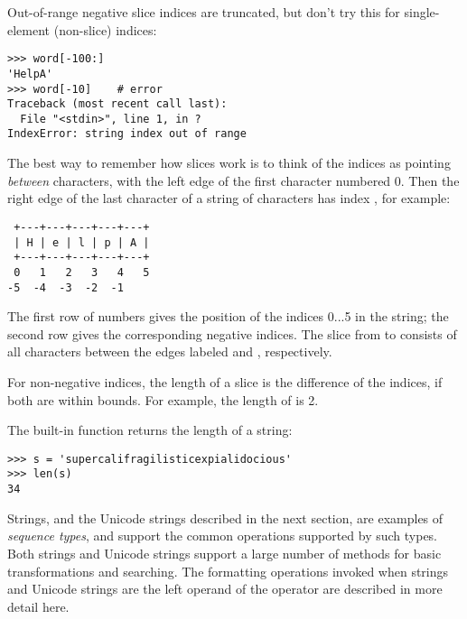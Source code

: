 \documentclass{manual}
\begin{document}
Out-of-range negative slice indices are truncated, but don't try this
for single-element (non-slice) indices:

\begin{verbatim}
>>> word[-100:]
'HelpA'
>>> word[-10]    # error
Traceback (most recent call last):
  File "<stdin>", line 1, in ?
IndexError: string index out of range
\end{verbatim}

The best way to remember how slices work is to think of the indices as
pointing \emph{between} characters, with the left edge of the first
character numbered 0.  Then the right edge of the last character of a
string of  characters has index , for example:

\begin{verbatim}
 +---+---+---+---+---+ 
 | H | e | l | p | A |
 +---+---+---+---+---+ 
 0   1   2   3   4   5 
-5  -4  -3  -2  -1
\end{verbatim}

The first row of numbers gives the position of the indices 0...5 in
the string; the second row gives the corresponding negative indices.
The slice from  to  consists of all characters between
the edges labeled  and , respectively.

For non-negative indices, the length of a slice is the difference of
the indices, if both are within bounds.  For example, the length of
 is 2.

The built-in function  returns the length of a string:

\begin{verbatim}
>>> s = 'supercalifragilisticexpialidocious'
>>> len(s)
34
\end{verbatim}


\begin{seealso}
           {Strings, and the Unicode strings described in the next
            section, are examples of \emph{sequence types}, and
            support the common operations supported by such types.}
           {Both strings and Unicode strings support a large number of
            methods for basic transformations and searching.}
           {The formatting operations invoked when strings and Unicode
            strings are the left operand of the \code{\%} operator are
            described in more detail here.}
\end{seealso}
\end{document}
